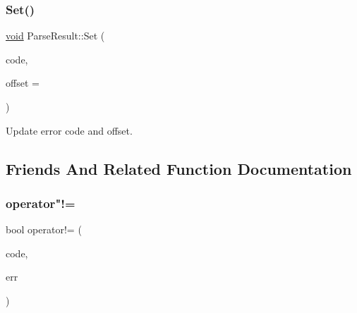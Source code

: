 \mbox{\label{structParseResult_aa81b4a7b776b77216cb752385203a8c1}} 
\subsubsection{\texorpdfstring{Set()}{Set()}}
{\footnotesize\ttfamily \hyperlink{imgui__impl__opengl3__loader_8h_ac668e7cffd9e2e9cfee428b9b2f34fa7}{void} Parse\+Result\+::\+Set (\begin{DoxyParamCaption}\item[{\hyperlink{group__RAPIDJSON__ERRORS_ga8d4b32dfc45840bca189ade2bbcb6ba7}{Parse\+Error\+Code}}]{code,  }\item[{size\+\_\+t}]{offset = {} }\end{DoxyParamCaption})\hspace{0.3cm}{\ttfamily [inline]}}



Update error code and offset. 



\subsection{Friends And Related Function Documentation}
\mbox{\label{structParseResult_a0498aebcfdd3d4a5dcb989ee29b93d4d}} 
\subsubsection{\texorpdfstring{operator"!=}{operator!=}}
{\footnotesize\ttfamily bool operator!= (\begin{DoxyParamCaption}\item[{\hyperlink{group__RAPIDJSON__ERRORS_ga8d4b32dfc45840bca189ade2bbcb6ba7}{Parse\+Error\+Code}}]{code,  }\item[{const \hyperlink{structParseResult}{Parse\+Result} \&}]{err }\end{DoxyParamCaption})\hspace{0.3cm}{\ttfamily [friend]}}

\mbox{\label{structParseResult_a58c9982e833d1c74686506ac7449200c}} 
